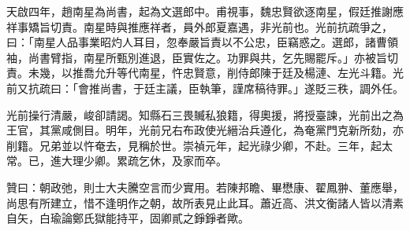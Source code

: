 \begin{pinyinscope}
天啟四年，趙南星為尚書，起為文選郎中。甫視事，魏忠賢欲逐南星，假廷推謝應祥事矯旨切責。南星時與推應祥者，員外郎夏嘉遇，非光前也。光前抗疏爭之，曰：「南星人品事業昭灼人耳目，忽奉嚴旨責以不公忠，臣竊惑之。選郎，諸曹領袖，尚書臂指，南星所甄別進退，臣實佐之。功罪與共，乞先賜罷斥。」亦被旨切責。未幾，以推喬允升等代南星，忤忠賢意，削侍郎陳于廷及楊漣、左光斗籍。光前又抗疏曰：「會推尚書，于廷主議，臣執筆，謹席稿待罪。」遂貶三秩，調外任。

光前操行清嚴，峻卻請謁。知縣石三畏贓私狼籍，得奧援，將授臺諫，光前出之為王官，其黨咸側目。明年，光前兄右布政使光縉治兵遵化，為奄黨門克新所劾，亦削籍。兄弟並以忤奄去，見稱於世。崇禎元年，起光祿少卿，不赴。三年，起太常。已，進大理少卿。累疏乞休，及家而卒。

贊曰：朝政弛，則士大夫騰空言而少實用。若陳邦瞻、畢懋康、翟鳳翀、董應舉，尚思有所建立，惜不逢明作之朝，故所表見止此耳。蕭近高、洪文衡諸人皆以清素自矢，白瑜論鄭氏獄能持平，固卿貳之錚錚者歟。


\end{pinyinscope}